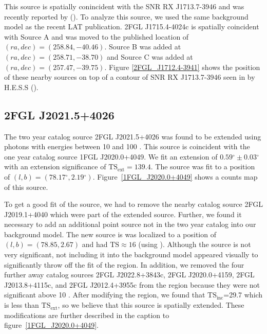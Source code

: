 \documentclass[12pt,preprint]{aastex}
\newcommand{\gev}{\text{GeV}\xspace}
\newcommand{\tev}{\text{TeV}\xspace}
\newcommand{\tsext}{{\ensuremath{\text{TS}_\text{ext}}}\xspace}
\newcommand{\tsinc}{\ensuremath{\text{TS}_\text{inc}}\xspace}
\newcommand{\ts}{\text{TS}\xspace}
\renewcommand{\deg}{\ensuremath{^\circ}\xspace}
\newcommand{\pointlike}{\text{\em pointlike}\xspace}
\begin{document}
This source is spatially conincident with the SNR RX J1713.7-3946 and was
recently reported by (\cite{rx_j1713_lat}).  To analyze this source,
we used the same background model as the recent LAT publication.
2FGL J1715.4-4024c is spatially coincident with Source A and was
moved to the published location of $(ra,dec)=(258.84,-40.46)$. Source
B was added at $(ra,dec)=(258.71,-38.70)$ and Source C was added at
$(ra,dec)=(257.47,-39.75)$.  Figure \ref{2FGL_J1712.4-3941} shows
the position of these nearby sources on top of a contour of SNR RX
J1713.7-3946 seen in \tev by H.E.S.S (\cite{rx_j1713_hess}).

\subsection{2FGL J2021.5+4026}
\label{section_2FGL J2021.5+4026}



The two year catalog source 2FGL J2021.5+4026 was found to be extended
using photons with energies between 10 \gev and 100 \gev. This source
is coincident with the one year catalog source 1FGL J2020.0+4049. We
fit an extension of $0.59\deg\pm0.03\deg$ with an extension
significance of $\tsext=139.4$.  The source was fit to a position of
$(l,b)=(78.17\deg,2.19\deg)$.  Figure~\ref{1FGL_J2020.0+4049} shows a
counts map of this source.

To get a good fit of the source, we had to remove the nearby catalog
source 2FGL J2019.1+4040 which were part of the extended source.
Further, we found it necessary to add an additional point source not in
the two year catalog into our background model.  The new source is was
localized to a position of $(l,b)=(78.85,2.67)$ and had $\ts\approx 16$
(using \pointlike).  Although the source is not very significant, not
including it into the background model appeared visually to significantly
throw off the fit of the region.  In addition, we removed the four
further away catalog sources 2FGL J2022.8+3843c, 2FGL J2020.0+4159,
2FGL J2013.8+4115c, and 2FGL J2012.4+3955c from the region because they
were not significant above 10 \gev.  After modifying the region, we found
that \tsinc=29.7 which is less than \tsext, so we believe that this
source is spatially extended.  These modifications are further described
in the caption to figure~\ref{1FGL_J2020.0+4049}.
\end{document}
